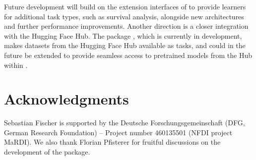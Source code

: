 \documentclass[article,shortnames]{jss}
\theoremstyle{definition}
\begin{document}
Future development will build on the extension interfaces of \mlrttorch{} to provide learners for additional task types, such as survival analysis, alongside new architectures and further performance improvements.
Another direction is a closer integration with the Hugging Face Hub.
The  package \citep{ref-mlr3hf}, which is currently in development, makes datasets from the Hugging Face Hub available as \mlrt{} tasks, and could in the future be extended to provide seamless access to pretrained models from the Hub within \mlrttorch{}.

%

\section*{Acknowledgments}

Sebastian Fischer is supported by the Deutsche Forschungsgemeinschaft (DFG, German Research Foundation) -- Project number 460135501 (NFDI project MaRDI).
We also thank Florian Pfisterer for fruitful discussions on the development of the package.


\end{document}
